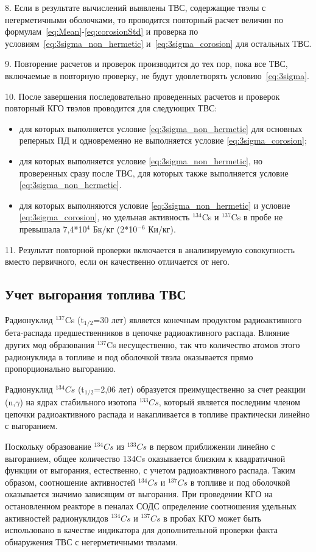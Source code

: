 8. Если в результате вычислений выявлены ТВС, содержащие твэлы с
негерметичными оболочками, то проводится повторный расчет величин по формулам~\ref{eq:Mean}-\ref{eq:corosionStd} и проверка по условиям~\ref{eq:3sigma_non_hermetic} и~\ref{eq:3sigma_corosion} для остальных ТВС.

9. Повторение расчетов и проверок производится до тех пор, пока все ТВС, включаемые в повторную проверку, не будут удовлетворять условию~\ref{eq:3sigma}.\label{povtor}

10. После завершения последовательно проведенных расчетов и проверок
повторный КГО твэлов проводится для следующих ТВС:
\begin{itemize}
	\item для которых выполняется условие \ref{eq:3sigma_non_hermetic} для основных реперных ПД и одновременно не выполняется условие \ref{eq:3sigma_corosion};
	\item для которых выполняется условие \ref{eq:3sigma_non_hermetic}, но проверенных сразу после ТВС, для которых также выполняется условие \ref{eq:3sigma_non_hermetic}.
	\item для которых выполняются условие \ref{eq:3sigma_non_hermetic} и условие \ref{eq:3sigma_corosion}, но удельная активность $^{134}$Cs и $^{137}$Cs в пробе не превышала 7,4*10$^{4}$ Бк/кг
	(2*10$^{-6}$ Ки/кг).
\end{itemize}

11. Результат повторной проверки включается в анализируемую совокупность вместо первичного, если он качественно отличается от него. 

\subsection{Учет выгорания топлива ТВС}

Радионуклид $^{137}$Cs (t$_{1/2}$=30 лет) является конечным продуктом
радиоактивного бета-распада предшественников в цепочке радиоактивного
распада. Влияние других мод образования $^{137}$Cs несущественно, так что
количество атомов этого радионуклида в топливе и под оболочкой твэла
оказывается прямо пропорционально выгоранию.

Радионуклид $^{134}Cs$ (t$_{1/2}$=2,06 лет) образуется преимущественно за счет реакции (n,$\gamma$) на ядрах стабильного изотопа $^{133}Cs$, который является последним членом цепочки радиоактивного распада и накапливается в топливе практически линейно с выгоранием.

Поскольку образование $^{134}Cs$ из $^{133}Cs$ в первом приближении линейно с выгоранием, общее количество 134Cs оказывается близким к квадратичной функции от выгорания, естественно, с учетом радиоактивного распада. Таким образом, соотношение активностей $^{134}Cs$ и $^{137}Cs$ в топливе и под оболочкой оказывается значимо зависящим от выгорания.
При проведении КГО на остановленном реакторе в пеналах СОДС
определение соотношения удельных активностей радионуклидов $^{134}Cs$ и $^{137}Cs$ в пробах КГО может быть использовано в качестве индикатора для дополнительной проверки факта обнаружения ТВС с негерметичными твэлами.

